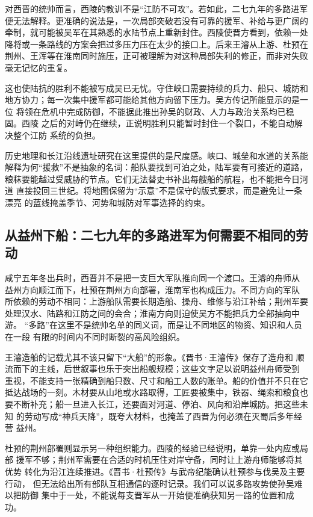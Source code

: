 对西晋的统帅而言，西陵的教训不是“江防不可攻”。若如此，二七九年的多路进军
便无法解释。更准确的说法是，一次局部突破若没有可靠的援军、补给与更广阔的
牵制，就可能被吴军在其熟悉的水陆节点上重新封住。西陵使晋方看到，依赖一处
降将或一条路线的方案会把过多压力压在太少的接口上。后来王濬从上游、杜预在
荆州、王浑等在淮南同时施压，正可被理解为对这种局部失利的修正，而非对失败
毫无记忆的重复。

这也使陆抗的胜利不能被写成吴已无忧。守住峡口需要持续的兵力、船只、城防和
地方协力；每一次集中援军都可能给其他方向留下压力。吴方传记所能显示的是一位
将领在危机中完成防御，不能据此推出孙吴的财政、人力与政治关系均已稳固。西陵
之后的对峙仍在继续，正说明胜利只能暂时封住一个裂口，不能自动解决整个江防
系统的负担。

历史地理和长江沿线遗址研究在这里提供的是尺度感。峡口、城垒和水道的关系能
解释为何“援救”不是抽象的名词：船队要找到可泊之处，陆军要有可接近的道路，
粮秣要能越过受威胁的节点。它们无法替史书补出每艘船的航程，也不能把今日河道
直接投回三世纪。将地图保留为“示意”不是保守的版式要求，而是避免让一条漂亮
的蓝线掩盖季节、河势和城防对军事选择的约束。

\subsection{从益州下船：二七九年的多路进军为何需要不相同的劳动}

咸宁五年冬出兵时，西晋并不是把一支巨大军队推向同一个渡口。王濬的舟师从
益州方向顺江而下，杜预在荆州方向部署，淮南军也构成压力。不同方向的军队
所依赖的劳动不相同：上游船队需要长期造船、操舟、维修与沿江补给；荆州军要
处理汉水、陆路和江防之间的会合；淮南方向则迫使吴方不能把兵力全部抽向中游。
“多路”在这里不是统帅名单的同义词，而是让不同地区的物资、知识和人员在一段
有限的时间内不同时断裂的高风险组织。

王濬造船的记载尤其不该只留下“大船”的形象。《晋书·王濬传》保存了造舟和
顺流而下的主线，后世叙事也乐于突出船舰规模；这些文字足以说明益州舟师受到
重视，不能支持一张精确到船只数、尺寸和船工人数的账单。船的价值并不只在它
抵达战场的一刻。木材要从山地或水路取得，工匠要被集中，铁器、绳索和粮食也
要不断补充；船一旦进入长江，还要面对河道、停泊、风向和沿岸城防。把这些未知
的劳动写成“神兵天降”，既夸大材料，也掩盖了西晋为何必须在灭蜀后多年经营
益州。

杜预的荆州部署则显示另一种组织能力。西陵的经验已经说明，单靠一处内应或局部
援军不够；荆州军需要在合适的时机压住对岸守备，同时让上游舟师能够将其优势
转化为沿江连续推进。《晋书·杜预传》与武帝纪能确认杜预参与伐吴及主要行动，
但无法给出所有部队互相通信的逐时记录。我们可以说多路攻势使孙吴难以把防御
集中于一处，不能说每支晋军从一开始便准确获知另一路的位置和成功。


